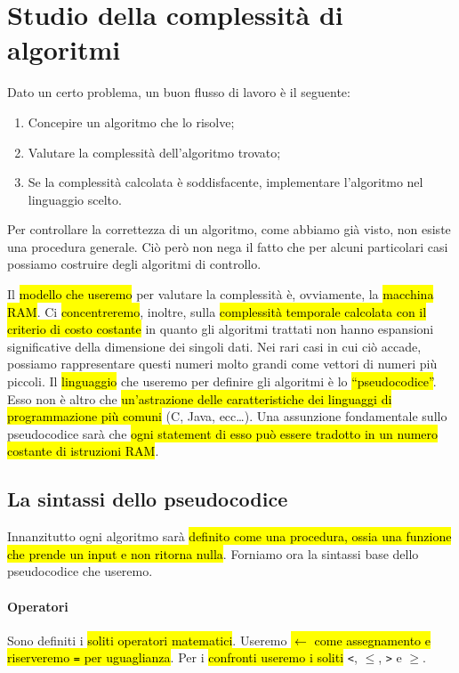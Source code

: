 \documentclass[a4paper,11pt,twoside]{article}
\theoremstyle{plain}
\theoremstyle{definition}
\theoremstyle{remark}
\newcommand{\peq}{$\gets$}
\begin{document}
\section{Studio della complessità di algoritmi}\label{sec:comp-alg}

Dato un certo problema, un buon flusso di lavoro è il seguente:

\begin{enumerate}
  \item Concepire un algoritmo che lo risolve;
  \item Valutare la complessità dell'algoritmo trovato;
  \item Se la complessità calcolata è soddisfacente, implementare l'algoritmo
    nel linguaggio scelto.
\end{enumerate}

Per controllare la correttezza di un algoritmo, come abbiamo già visto, non
esiste una procedura generale. Ciò però non nega il fatto che per alcuni
particolari casi possiamo costruire degli algoritmi di controllo.

Il \hl{modello che useremo} per valutare la complessità è, ovviamente, la
\hl{macchina RAM}\@. Ci \hl{concentreremo}, inoltre, sulla \hl{complessità
temporale calcolata con il criterio di costo costante} in quanto gli algoritmi
trattati non hanno espansioni significative della dimensione dei singoli dati.
Nei rari casi in cui ciò accade, possiamo rappresentare questi numeri molto
grandi come vettori di numeri più piccoli. Il \hl{linguaggio} che useremo per
definire gli algoritmi è lo \hl{``pseudocodice''}. Esso non è altro che
\hl{un'astrazione delle caratteristiche dei linguaggi di programmazione più
comuni} (C, Java, ecc\dots). Una assunzione fondamentale sullo pseudocodice sarà
che \hl{ogni statement di esso può essere tradotto in un numero costante di
istruzioni RAM}\@.

\subsection{La sintassi dello pseudocodice}\label{sec:syntax-pseudocodice}

Innanzitutto ogni algoritmo sarà \hl{definito come una procedura, ossia una
funzione che prende un input e non ritorna nulla}. Forniamo ora la sintassi base
dello pseudocodice che useremo.

\paragraph{Operatori} Sono definiti i \hl{soliti operatori matematici}. Useremo
\hl{\peq{} come assegnamento e riserveremo \texttt{=} per uguaglianza}. Per i
\hl{confronti useremo i soliti} \texttt{<}, $\leq$, \texttt{>} e $\geq$.
\end{document}
